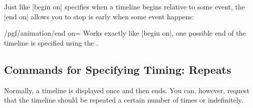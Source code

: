Just like |begin on| specifies when a timeline begins relative to some event,
the |end on| allows you to stop is early when some event happens:

\begin{key}{/pgf/animation/end on=}
    Works exactly like |begin on|, one possible end of the timeline is
    specified using the .
\end{key}


\subsection{Commands for Specifying Timing: Repeats}

Normally, a timeline is displayed once and then ends. You can, however, request
that the timeline should be repeated a certain number of times or indefinitely.

